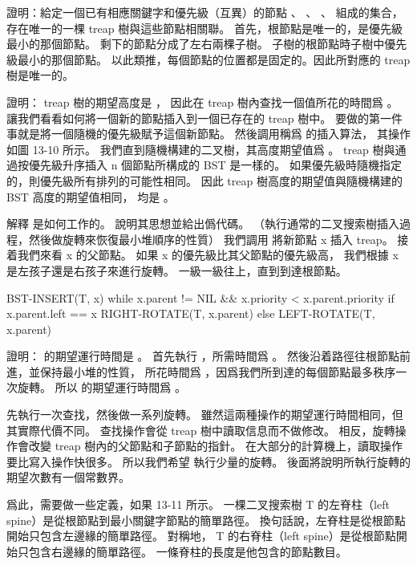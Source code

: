 \startigBase[a]
\startitem%
證明：給定一個已有相應關鍵字和優先級（互異）的節點  、 、 \m{\ldots}、  組成的集合，
存在唯一的一棵 treap 樹與這些節點相關聯。
\stopitem
\startANSWER
首先，根節點是唯一的，是優先級最小的那個節點。
剩下的節點分成了左右兩棵子樹。
子樹的根節點時子樹中優先級最小的那個節點。
以此類推，每個節點的位置都是固定的。因此所對應的 treap 樹是唯一的。
\stopANSWER

\startitem%
證明： treap 樹的期望高度是 ，
因此在 treap 樹內查找一個值所花的時間爲 。
讓我們看看如何將一個新的節點插入到一個已存在的 treap 樹中。
要做的第一件事就是將一個隨機的優先級賦予這個新節點。
然後調用稱爲  的插入算法，
其操作如圖 13-10 所示。
\stopitem
\startANSWER
我們直到隨機構建的二叉樹，其高度期望值爲 。
 treap 樹與通過按優先級升序插入 n 個節點所構成的 BST 是一樣的。
如果優先級時隨機指定的，則優先級所有排列的可能性相同。
因此 treap 樹高度的期望值與隨機構建的 BST 高度的期望值相同，
均是 。
\stopANSWER

\startitem%
解釋  是如何工作的。
說明其思想並給出僞代碼。
（\hint 執行通常的二叉搜索樹插入過程，然後做旋轉來恢復最小堆順序的性質）
\stopitem
\startANSWER
我們調用  將新節點 x 插入 treap。
接着我們來看 x 的父節點。
如果 x 的優先級比其父節點的優先級高，
我們根據 x 是左孩子還是右孩子來進行旋轉。
一級一級往上，直到到達根節點。

\startCLRS
BST-INSERT(T, x)
while x.parent != NIL && x.priority < x.parent.priority
	if x.parent.left == x
		RIGHT-ROTATE(T, x.parent)
	else
		LEFT-ROTATE(T, x.parent)
\stopCLRS
\stopANSWER

\startitem%
證明：  的期望運行時間是 。
\stopitem
\startANSWER
{} 首先執行 ，所需時間爲 。
然後沿着路徑往根節點前進，並保持最小堆的性質，
所花時間爲 ，因爲我們所到達的每個節點最多秩序一次旋轉。
所以  的期望運行時間爲 。
\stopANSWER

 先執行一次查找，然後做一系列旋轉。
雖然這兩種操作的期望運行時間相同，但其實際代價不同。
查找操作會從 treap 樹中讀取信息而不做修改。
相反，旋轉操作會改變 treap 樹內的父節點和子節點的指針。
在大部分的計算機上，讀取操作要比寫入操作快很多。
所以我們希望  執行少量的旋轉。
後面將說明所執行旋轉的期望次數有一個常數界。

爲此，需要做一些定義，如果 13-11 所示。
一棵二叉搜索樹 T 的{\EMP 左脊柱（left spine）}是從根節點到最小關鍵字節點的簡單路徑。
換句話說，左脊柱是從根節點開始只包含左邊緣的簡單路徑。
對稱地， T 的{\EMP 右脊柱（left spine）}是從根節點開始只包含右邊緣的簡單路徑。
一條脊柱的長度是他包含的節點數目。

